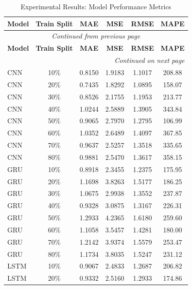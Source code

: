 
\begin{longtable}{l c c c c c}
    \toprule
    \textbf{Model} & \textbf{Train Split} & \textbf{MAE} & \textbf{MSE} & \textbf{RMSE} & \textbf{MAPE} \\
    \midrule
    \endfirsthead

    \multicolumn{6}{c}{{\textit{Continued from previous page}}} \\
    \toprule
    \textbf{Model} & \textbf{Train Split} & \textbf{MAE} & \textbf{MSE} & \textbf{RMSE} & \textbf{MAPE} \\
    \midrule
    \endhead

    \midrule \multicolumn{6}{r}{{\textit{Continued on next page}}} \\
    \endfoot

    \bottomrule
    \caption{Experimental Results: Model Performance Metrics}
    \label{tab:results_longtable}
    \endlastfoot
        CNN & 10\% & 0.8150 & 1.9183 & 1.1017 & 208.88 \\
        CNN & 20\% & 0.7435 & 1.8292 & 1.0895 & 158.07 \\
        CNN & 30\% & 0.8526 & 2.1755 & 1.1953 & 213.77 \\
        CNN & 40\% & 1.0244 & 2.5889 & 1.3905 & 343.84 \\
        CNN & 50\% & 0.9065 & 2.7970 & 1.2795 & 106.99 \\
        CNN & 60\% & 1.0352 & 2.6489 & 1.4097 & 367.85 \\
        CNN & 70\% & 0.9637 & 2.5257 & 1.3518 & 335.65 \\
        CNN & 80\% & 0.9881 & 2.5470 & 1.3617 & 358.15 \\
        GRU & 10\% & 0.8918 & 2.3455 & 1.2375 & 175.95 \\
        GRU & 20\% & 1.1698 & 3.8263 & 1.5177 & 186.25 \\
        GRU & 30\% & 1.0675 & 2.9938 & 1.3552 & 237.87 \\
        GRU & 40\% & 0.9328 & 3.0875 & 1.3167 & 226.31 \\
        GRU & 50\% & 1.2933 & 4.2365 & 1.6180 & 259.60 \\
        GRU & 60\% & 1.1058 & 3.5457 & 1.4281 & 180.00 \\
        GRU & 70\% & 1.2142 & 3.9374 & 1.5579 & 253.47 \\
        GRU & 80\% & 1.1734 & 3.8035 & 1.5247 & 231.12 \\
        LSTM & 10\% & 0.9067 & 2.4833 & 1.2687 & 206.82 \\
        LSTM & 20\% & 0.9332 & 2.5160 & 1.2933 & 174.86 \\

\end{longtable}
